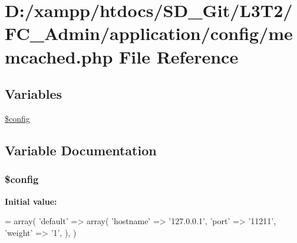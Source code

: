 \hypertarget{memcached_8php}{}\section{D\+:/xampp/htdocs/\+S\+D\+\_\+\+Git/\+L3\+T2/\+F\+C\+\_\+\+Admin/application/config/memcached.php File Reference}
\label{memcached_8php}
\subsection*{Variables}
\begin{DoxyCompactItemize}
\item 
\hyperlink{memcached_8php_a49c7011be9c979d9174c52a8b83e5d8e}{\$config}
\end{DoxyCompactItemize}


\subsection{Variable Documentation}
\hypertarget{memcached_8php_a49c7011be9c979d9174c52a8b83e5d8e}{}
\subsubsection[{\$config}]{\setlength{\rightskip}{0pt plus 5cm}\$config}\label{memcached_8php_a49c7011be9c979d9174c52a8b83e5d8e}
{\bfseries Initial value\+:}
\begin{DoxyCode}
= array(
    \textcolor{stringliteral}{'default'} => array(
        \textcolor{stringliteral}{'hostname'} => \textcolor{stringliteral}{'127.0.0.1'},
        \textcolor{stringliteral}{'port'}     => \textcolor{stringliteral}{'11211'},
        \textcolor{stringliteral}{'weight'}   => \textcolor{charliteral}{'1'},
    ),
)
\end{DoxyCode}
